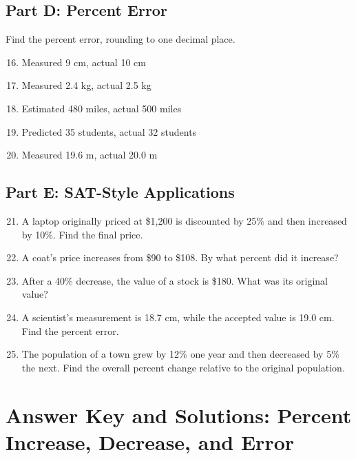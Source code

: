 \documentclass[12pt]{article}
\begin{document}
\subsection*{Part D: Percent Error}
Find the percent error, rounding to one decimal place.
\begin{enumerate}
  \setcounter{enumi}{15}
  \item Measured 9 cm, actual 10 cm
  \item Measured 2.4 kg, actual 2.5 kg
  \item Estimated 480 miles, actual 500 miles
  \item Predicted 35 students, actual 32 students
  \item Measured 19.6 m, actual 20.0 m
\end{enumerate}

\subsection*{Part E: SAT-Style Applications}
\begin{enumerate}
  \setcounter{enumi}{20}
  \item A laptop originally priced at \$1,200 is discounted by 25\% and then increased by 10\%. Find the final price.
  \item A coat’s price increases from \$90 to \$108. By what percent did it increase?
  \item After a 40\% decrease, the value of a stock is \$180. What was its original value?
  \item A scientist’s measurement is 18.7 cm, while the accepted value is 19.0 cm. Find the percent error.
  \item The population of a town grew by 12\% one year and then decreased by 5\% the next. Find the overall percent change relative to the original population.
\end{enumerate}

\newpage

\section*{Answer Key and Solutions: Percent Increase, Decrease, and Error}
\end{document}
